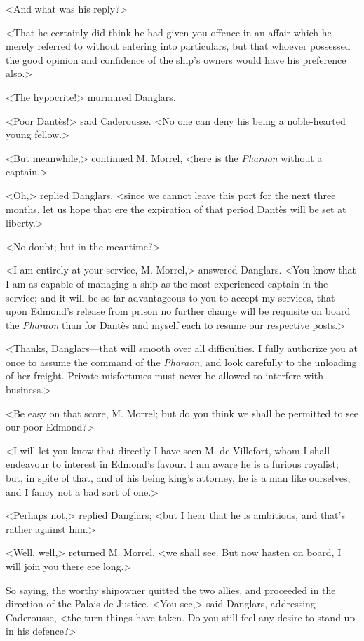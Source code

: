  <And what was his reply?> 

 <That he certainly did think he had given you offence in an affair which he merely referred to without entering into particulars, but that whoever possessed the good opinion and confidence of the ship's owners would have his preference also.> 

 <The hypocrite!> murmured Danglars. 

 <Poor Dantès!> said Caderousse. <No one can deny his being a noble-hearted young fellow.> 

 <But meanwhile,> continued M. Morrel, <here is the \textit{Pharaon} without a captain.> 

 <Oh,> replied Danglars, <since we cannot leave this port for the next three months, let us hope that ere the expiration of that period Dantès will be set at liberty.> 

 <No doubt; but in the meantime?> 

 <I am entirely at your service, M. Morrel,> answered Danglars. <You know that I am as capable of managing a ship as the most experienced captain in the service; and it will be so far advantageous to you to accept my services, that upon Edmond's release from prison no further change will be requisite on board the \textit{Pharaon} than for Dantès and myself each to resume our respective posts.> 

 <Thanks, Danglars—that will smooth over all difficulties. I fully authorize you at once to assume the command of the \textit{Pharaon}, and look carefully to the unloading of her freight. Private misfortunes must never be allowed to interfere with business.> 

 <Be easy on that score, M. Morrel; but do you think we shall be permitted to see our poor Edmond?> 

 <I will let you know that directly I have seen M. de Villefort, whom I shall endeavour to interest in Edmond's favour. I am aware he is a furious royalist; but, in spite of that, and of his being king's attorney, he is a man like ourselves, and I fancy not a bad sort of one.> 

 <Perhaps not,> replied Danglars; <but I hear that he is ambitious, and that's rather against him.> 

 <Well, well,> returned M. Morrel, <we shall see. But now hasten on board, I will join you there ere long.> 

 So saying, the worthy shipowner quitted the two allies, and proceeded in the direction of the Palais de Justice.  <You see,> said Danglars, addressing Caderousse, <the turn things have taken. Do you still feel any desire to stand up in his defence?> 

